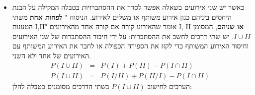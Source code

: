 \documentclass[12pt,a4paper]{article}
\newcommand{\bover}[1]{\bm{\overline{#1}}}
\begin{document}
\begin{itemize}
\item
כאשר יש שני אירועים בשאלה אפשר לסדר את ההסתברויות בטבלה המקילה על הבנת היחסים ביניהם כגון אירוע משותף או משלים לאירוע. הניסוח "%
\textbf{לפחות אחת}
משתי הטענות I,II" אומר שהאירוע קורה אם קורה אחד מהאירועים I, II
\textbf{או שניהם},
המסומן 
$I \cup II$.
יש שתי דרכים לחשב את ההסתברות: על ידי חיבור ההסתברות של שני האירועים וחיסור האירוע המשותף כדי לקזז את הספירה הכפולה או לחבר את האירוע המשותף עם האירועים של אחד ולא השני.
\begin{eqnarray*}
P(I \cup II) &=& P(I) + P(II) - P(I \cap II)\\
P(I \cup II) &=& P(I/ II) + P(II/ I) - P(I \cap II)\,.
\end{eqnarray*}
הערכים לחישוב
$P(I \cup II)$
בשתי הדרכים מסומנים בטבלה להלן:
\begin{center}
\end{center}



\end{itemize}
\end{document}
